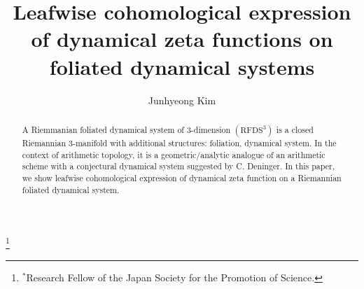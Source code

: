\title{Leafwise cohomological expression of dynamical zeta functions on foliated dynamical systems}
\author{Junhyeong Kim}
\date{}

\address{
Graduate School of mathematics \endgraf 
Kyushu University  Motooka, Nishi-ku, \endgraf
Fukuoka 819-0395, Japan
}


\thanks{$^*$Research Fellow of the Japan Society for the Promotion of Science.}



\begin{abstract}
A Riemmanian foliated dynamical system of 3-dimension $(\mathrm{RFDS}^{3})$ is a closed Riemannian 3-manifold with additional structures: foliation, dynamical system. 
In the context of arithmetic topology, it is a geometric/analytic analogue of an arithmetic scheme with a conjectural dynamical system suggested by C. Deninger.
In this paper, we show leafwise cohomological expression of dynamical zeta function on a Riemannian foliated dynamical system. 
\end{abstract}
